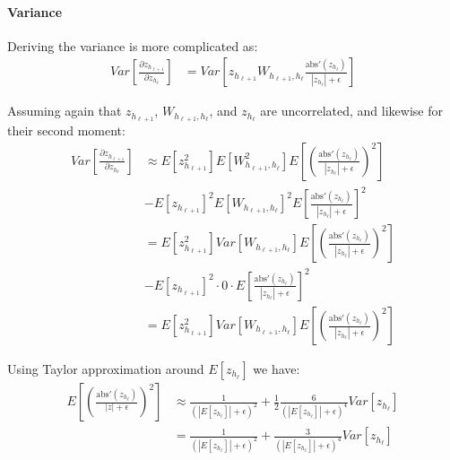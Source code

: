 \paragraph{Variance} Deriving the variance is more complicated as:
\begin{equation}
\begin{aligned}
Var\left[\frac{\partial z_{h_{\ell+1}}}{\partial z_{h_\ell}}\right] &= Var\left[z_{h_{\ell+1}} W_{h_{\ell+1}, h_{\ell}} \frac{\mathrm{abs}'(z_{h_{\ell}})}{|z_{h_{\ell}}| + \epsilon}\right]
\end{aligned}
\end{equation}

Assuming again that $z_{h_{\ell+1}}$, $W_{h_{\ell+1},h_\ell}$, and $z_{h_\ell}$ are uncorrelated, and likewise for their second moment:
\begin{equation}
\begin{aligned}
Var\left[\frac{\partial z_{h_{\ell+1}}}{\partial z_{h_\ell}}\right] & \approx E[z_{h_{\ell+1}}^2] E[W_{h_{\ell+1}, h_{\ell}}^2] E\left[\left( \frac{\mathrm{abs}'(z_{h_{\ell}})}{|z_{h_{\ell}}| + \epsilon}\right)^2\right] \\
&- E[z_{h_{\ell+1}}]^2 E[W_{h_{\ell+1}, h_{\ell}}]^2 E\left[ \frac{\mathrm{abs}'(z_{h_{\ell}})}{|z_{h_{\ell}}| + \epsilon}\right]^2 \\
&= E[z_{h_{\ell+1}}^2] Var[W_{h_{\ell+1}, h_{\ell}}] E\left[\left( \frac{\mathrm{abs}'(z_{h_{\ell}})}{|z_{h_{\ell}}| + \epsilon}\right)^2\right] \\
&- E[z_{h_{\ell+1}}]^2 \cdot 0 \cdot E\left[ \frac{\mathrm{abs}'(z_{h_{\ell}})}{|z_{h_{\ell}}| + \epsilon}\right]^2 \\
&= E[z_{h_{\ell+1}}^2] Var[W_{h_{\ell+1}, h_{\ell}}] E\left[\left( \frac{\mathrm{abs}'(z_{h_{\ell}})}{|z_{h_{\ell}}| + \epsilon}\right)^2\right]
\end{aligned}
\end{equation}

Using Taylor approximation around $E[z_{h_{\ell}}]$ we have:
\begin{equation}
\begin{aligned}
E\left[\left(\frac{\mathrm{abs}'(z_{h_{\ell}})}{|z| + \epsilon}\right)^2\right] &\approx\frac{1}{\left(|E[z_{h_{\ell}}]| + \epsilon\right)^2} + \frac{1}{2} \frac{6}{\left(|E[z_{h_{\ell}}]| + \epsilon\right)^4} Var[z_{h_{\ell}}] \\
&= \frac{1}{\left(|E[z_{h_{\ell}}]| + \epsilon\right)^2} + \frac{3}{\left(|E[z_{h_{\ell}}]| + \epsilon\right)^4} Var[z_{h_{\ell}}]
\end{aligned}
\end{equation}

